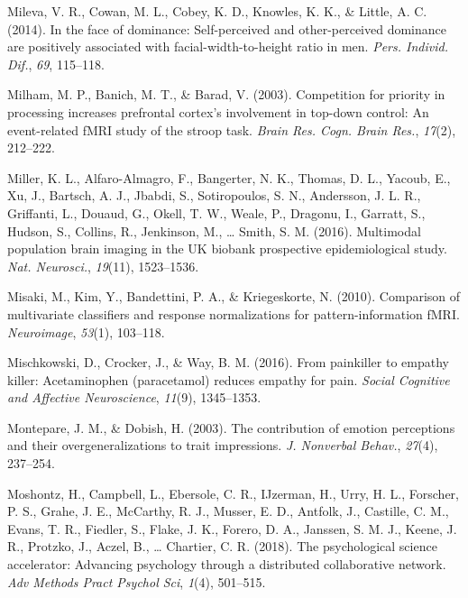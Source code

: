 \documentclass[11pt,american,a4paper,oneside,]{memoir} %
\begin{document}
\leavevmode\hypertarget{ref-Mileva2014-ld}{}%
Mileva, V. R., Cowan, M. L., Cobey, K. D., Knowles, K. K., \& Little, A. C. (2014). In the face of dominance: Self-perceived and other-perceived dominance are positively associated with facial-width-to-height ratio in men. \emph{Pers. Individ. Dif.}, \emph{69}, 115--118.

\leavevmode\hypertarget{ref-Milham2003-zc}{}%
Milham, M. P., Banich, M. T., \& Barad, V. (2003). Competition for priority in processing increases prefrontal cortex's involvement in top-down control: An event-related fMRI study of the stroop task. \emph{Brain Res. Cogn. Brain Res.}, \emph{17}(2), 212--222.

\leavevmode\hypertarget{ref-Miller2016-oi}{}%
Miller, K. L., Alfaro-Almagro, F., Bangerter, N. K., Thomas, D. L., Yacoub, E., Xu, J., Bartsch, A. J., Jbabdi, S., Sotiropoulos, S. N., Andersson, J. L. R., Griffanti, L., Douaud, G., Okell, T. W., Weale, P., Dragonu, I., Garratt, S., Hudson, S., Collins, R., Jenkinson, M., \ldots{} Smith, S. M. (2016). Multimodal population brain imaging in the UK biobank prospective epidemiological study. \emph{Nat. Neurosci.}, \emph{19}(11), 1523--1536.

\leavevmode\hypertarget{ref-misaki2010comparison}{}%
Misaki, M., Kim, Y., Bandettini, P. A., \& Kriegeskorte, N. (2010). Comparison of multivariate classifiers and response normalizations for pattern-information fMRI. \emph{Neuroimage}, \emph{53}(1), 103--118.

\leavevmode\hypertarget{ref-mischkowski2016painkiller}{}%
Mischkowski, D., Crocker, J., \& Way, B. M. (2016). From painkiller to empathy killer: Acetaminophen (paracetamol) reduces empathy for pain. \emph{Social Cognitive and Affective Neuroscience}, \emph{11}(9), 1345--1353.

\leavevmode\hypertarget{ref-Montepare2003-hy}{}%
Montepare, J. M., \& Dobish, H. (2003). The contribution of emotion perceptions and their overgeneralizations to trait impressions. \emph{J. Nonverbal Behav.}, \emph{27}(4), 237--254.

\leavevmode\hypertarget{ref-Moshontz2018-rc}{}%
Moshontz, H., Campbell, L., Ebersole, C. R., IJzerman, H., Urry, H. L., Forscher, P. S., Grahe, J. E., McCarthy, R. J., Musser, E. D., Antfolk, J., Castille, C. M., Evans, T. R., Fiedler, S., Flake, J. K., Forero, D. A., Janssen, S. M. J., Keene, J. R., Protzko, J., Aczel, B., \ldots{} Chartier, C. R. (2018). The psychological science accelerator: Advancing psychology through a distributed collaborative network. \emph{Adv Methods Pract Psychol Sci}, \emph{1}(4), 501--515.
\end{document}
